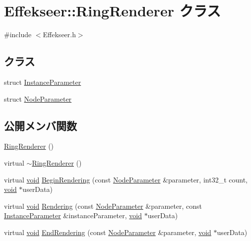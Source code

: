 \hypertarget{class_effekseer_1_1_ring_renderer}{}\section{Effekseer\+:\+:Ring\+Renderer クラス}
\label{class_effekseer_1_1_ring_renderer}


{\ttfamily \#include $<$Effekseer.\+h$>$}

\subsection*{クラス}
\begin{DoxyCompactItemize}
\item 
struct \mbox{\hyperlink{struct_effekseer_1_1_ring_renderer_1_1_instance_parameter}{Instance\+Parameter}}
\item 
struct \mbox{\hyperlink{struct_effekseer_1_1_ring_renderer_1_1_node_parameter}{Node\+Parameter}}
\end{DoxyCompactItemize}
\subsection*{公開メンバ関数}
\begin{DoxyCompactItemize}
\item 
\mbox{\hyperlink{class_effekseer_1_1_ring_renderer_a6a5d92df4204df47ae52c595b54814c1}{Ring\+Renderer}} ()
\item 
virtual \mbox{\hyperlink{class_effekseer_1_1_ring_renderer_a99bab63ecdf35209cb265aea5745664a}{$\sim$\+Ring\+Renderer}} ()
\item 
virtual \mbox{\hyperlink{namespace_effekseer_ab34c4088e512200cf4c2716f168deb56}{void}} \mbox{\hyperlink{class_effekseer_1_1_ring_renderer_af9e48de3e9024b7e2abd950e4300b426}{Begin\+Rendering}} (const \mbox{\hyperlink{struct_effekseer_1_1_ring_renderer_1_1_node_parameter}{Node\+Parameter}} \&parameter, int32\+\_\+t count, \mbox{\hyperlink{namespace_effekseer_ab34c4088e512200cf4c2716f168deb56}{void}} $\ast$user\+Data)
\item 
virtual \mbox{\hyperlink{namespace_effekseer_ab34c4088e512200cf4c2716f168deb56}{void}} \mbox{\hyperlink{class_effekseer_1_1_ring_renderer_ac43fd38e8d1dc8c8916518a6e4ed6c22}{Rendering}} (const \mbox{\hyperlink{struct_effekseer_1_1_ring_renderer_1_1_node_parameter}{Node\+Parameter}} \&parameter, const \mbox{\hyperlink{struct_effekseer_1_1_ring_renderer_1_1_instance_parameter}{Instance\+Parameter}} \&instance\+Parameter, \mbox{\hyperlink{namespace_effekseer_ab34c4088e512200cf4c2716f168deb56}{void}} $\ast$user\+Data)
\item 
virtual \mbox{\hyperlink{namespace_effekseer_ab34c4088e512200cf4c2716f168deb56}{void}} \mbox{\hyperlink{class_effekseer_1_1_ring_renderer_a681963d704b42577665a10722140eb34}{End\+Rendering}} (const \mbox{\hyperlink{struct_effekseer_1_1_ring_renderer_1_1_node_parameter}{Node\+Parameter}} \&parameter, \mbox{\hyperlink{namespace_effekseer_ab34c4088e512200cf4c2716f168deb56}{void}} $\ast$user\+Data)
\end{DoxyCompactItemize}


